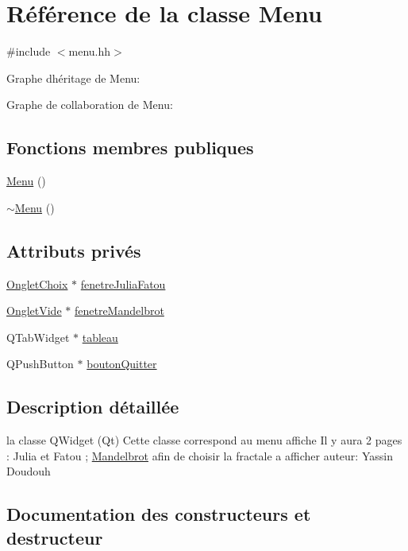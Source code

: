 \hypertarget{classMenu}{}\section{Référence de la classe Menu}
\label{classMenu}


{\ttfamily \#include $<$menu.\+hh$>$}



Graphe d\textquotesingle{}héritage de Menu\+:


Graphe de collaboration de Menu\+:
\subsection*{Fonctions membres publiques}
\begin{DoxyCompactItemize}
\item 
\hyperlink{classMenu_ad466dd83355124a6ed958430450bfe94}{Menu} ()
\item 
\hyperlink{classMenu_a831387f51358cfb88cd018e1777bc980}{$\sim$\+Menu} ()
\end{DoxyCompactItemize}
\subsection*{Attributs privés}
\begin{DoxyCompactItemize}
\item 
\hyperlink{classOngletChoix}{Onglet\+Choix} $\ast$ \hyperlink{classMenu_aedcc1cdce0b64f787d05e2625b488211}{fenetre\+Julia\+Fatou}
\item 
\hyperlink{classOngletVide}{Onglet\+Vide} $\ast$ \hyperlink{classMenu_a0cb5416b7f7266693059c3f8038aaba3}{fenetre\+Mandelbrot}
\item 
Q\+Tab\+Widget $\ast$ \hyperlink{classMenu_afe56e53267ccb7f91c2d8e52c8504ef2}{tableau}
\item 
Q\+Push\+Button $\ast$ \hyperlink{classMenu_a71e7ddf2318b3199bb724f96ade1dbc2}{bouton\+Quitter}
\end{DoxyCompactItemize}


\subsection{Description détaillée}
la classe Q\+Widget (Qt) Cette classe correspond au menu affiche Il y aura 2 pages \+: Julia et Fatou ; \hyperlink{classMandelbrot}{Mandelbrot} afin de choisir la fractale a afficher auteur\+: Yassin Doudouh 

\subsection{Documentation des constructeurs et destructeur}
\mbox{\label{classMenu_ad466dd83355124a6ed958430450bfe94}} 
